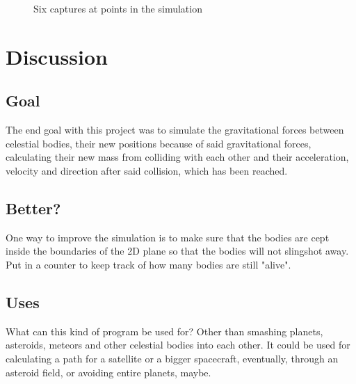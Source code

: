 \documentclass[11pt]{article}
\begin{document}
\begin{figure}[h]
	\caption{Six captures at points in the simulation}
\end{figure}

\section{Discussion}
\subsection{Goal}
The end goal with this project was to simulate the gravitational forces between celestial bodies, their new positions because of said gravitational forces, calculating their new mass from colliding with each other and their acceleration, velocity and direction after said collision, which has been reached.
\subsection{Better?}
One way to improve the simulation is to make sure that the bodies are cept inside the boundaries of the 2D plane so that the bodies will not slingshot away. Put in a counter to keep track of how many bodies are still "alive". 
\subsection{Uses}
What can this kind of program be used for? Other than smashing planets, asteroids, meteors and other celestial bodies into each other. 
It could be used for calculating a path for a satellite or a bigger spacecraft, eventually, through an asteroid field, or avoiding entire planets, maybe. 

\printbibliography
\end{document}
